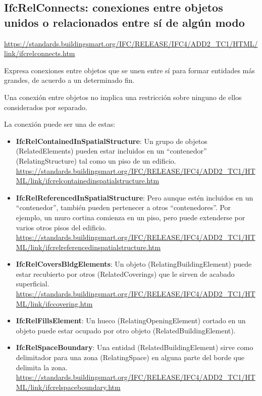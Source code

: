 \documentclass[spanish,12pt,a4paper,final,oneside]{book}
\begin{document}
\subsection{IfcRelConnects: conexiones entre objetos unidos o relacionados entre sí de algún modo}
\url{https://standards.buildingsmart.org/IFC/RELEASE/IFC4/ADD2_TC1/HTML/link/ifcrelconnects.htm}

Expresa conexiones entre objetos que se unen entre sí para formar entidades más grandes, de acuerdo a un determinado fin.

Una conexión entre objetos no implica una restricción sobre ninguno de ellos considerados por separado.

La conexión puede ser una de estas:
\begin{itemize}

\item \textbf{IfcRelContainedInSpatialStructure}: Un grupo de objetos (RelatedElements) pueden estar incluidos en un ``contenedor'' (RelatingStructure) tal como un piso de un edificio.
\\ \url{https://standards.buildingsmart.org/IFC/RELEASE/IFC4/ADD2_TC1/HTML/link/ifcrelcontainedinspatialstructure.htm}

\item \textbf{IfcRelReferencedInSpatialStructure}: Pero aunque estén incluidos en un ``contenedor'', también pueden pertenecer a otros ``contenedores''. Por ejemplo, un muro cortina comienza en un piso, pero puede extenderse por varios otros pisos del edificio.
\\ \url{https://standards.buildingsmart.org/IFC/RELEASE/IFC4/ADD2_TC1/HTML/link/ifcrelreferencedinspatialstructure.htm}

\item \textbf{IfcRelCoversBldgElements}: Un objeto (RelatingBuildingElement) puede estar recubierto por otros (RelatedCoverings) que le sirven de acabado superficial.
\\ \url{https://standards.buildingsmart.org/IFC/RELEASE/IFC4/ADD2_TC1/HTML/link/ifccovering.htm}

\item \textbf{IfcRelFillsElement}: Un hueco (RelatingOpeningElement) cortado en un objeto puede estar ocupado por otro objeto (RelatedBuildingElement).

\item \textbf{IfcRelSpaceBoundary}: Una entidad (RelatedBuildingElement) sirve como delimitador para una zona (RelatingSpace) en alguna parte del borde que delimita la zona.
\\ \url{https://standards.buildingsmart.org/IFC/RELEASE/IFC4/ADD2_TC1/HTML/link/ifcrelspaceboundary.htm}


\end{itemize}
\end{document}
